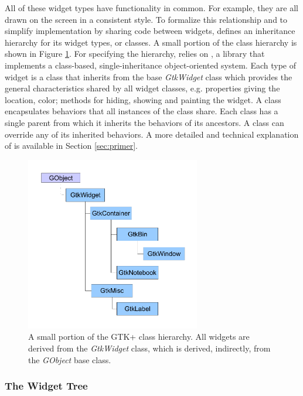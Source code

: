 \documentclass[article]{jss}
\begin{document}
All of these widget types have functionality in common. For example,
they are
all drawn on the screen in a consistent style. To formalize this
relationship 
and to simplify implementation by sharing code
between widgets,  defines an inheritance hierarchy for its
widget
types, or classes. A small portion of the  class hierarchy
is shown
in Figure \ref{fig:class-hierarchy}. For specifying the hierarchy,
relies on , a  library that implements a
class-based, single-inheritance 
object-oriented system.  Each type of  widget is a
class that inherits from the base \emph{GtkWidget} class which
provides the general characteristics shared by all widget classes,
e.g. properties giving the location, color; methods for hiding,
showing and painting the widget. A  
class encapsulates behaviors that all instances of the class share. 
Each class has a single parent from which it inherits 
the behaviors of its ancestors. A class can override any of its
inherited behaviors.
A more detailed and technical explanation of  is
available in 
Section \ref{sec:primer}. 

\begin{figure}
\begin{center}
\includegraphics[width=3in]{class-hierarchy.pdf}
\caption{\label{fig:class-hierarchy}A small portion of the GTK+ class
hierarchy. 
All widgets are derived from the \emph{GtkWidget} class, which is
derived, 
indirectly, from the \emph{GObject} base class.}
\end{center}
\end{figure}

\subsubsection{The Widget Tree}
\end{document}
